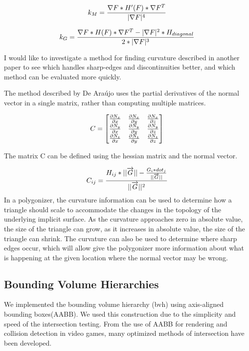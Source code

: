 \documentclass[conference]{acmsiggraph}
\begin{document}
$$k_M = {\nabla F * H'(F) * \nabla F^T \over |\nabla F|^4}$$

$$k_G = {\nabla F * H(F) * \nabla F^T - |\nabla F|^2 * H_{diagonal} \over 2 *
|\nabla F|^3}$$

I would like to investigate a method for finding curvature described in another
paper\cite{DeAraujo2004} to see which handles sharp-edges and discontinuities
better, and which method can be evaluated more quickly.

The method described by De Ara\'{u}jo uses the partial derivatives of the
normal vector in a single matrix, rather than computing multiple matrices.

$$
C=
\begin{bmatrix}
	{\partial N_x \over \partial x}&{\partial N_x \over \partial y}&{\partial N_x \over \partial z}\\
	{\partial N_y \over \partial x}&{\partial N_y \over \partial y}&{\partial N_y \over \partial z}\\
	{\partial N_z \over \partial x}&{\partial N_z \over \partial y}&{\partial N_z \over \partial z}
\end{bmatrix}
$$

The matrix C can be defined using the hessian matrix and the normal vector.

$$
C_{ij} = {H_{ij} * ||\overrightarrow{G}|| - {G_i * dot_j \over
	||\overrightarrow{G}||} \over ||\overrightarrow{G}||^2}
$$
In a polygonizer, the curvature information can be used to determine how a
triangle should scale to accommodate the changes in the topology of the
underlying implicit surface. As the curvature approaches zero in absolute value,
the size of the triangle can grow, as it increases in absolute value, the size
of the triangle can shrink. The curvature can also be used to determine where
sharp edges occur, which will allow give the polygonizer more information about
what is happening at the given location where the normal vector may be wrong.

\subsection{Bounding Volume Hierarchies}
We implemented the bounding volume hierarchy (bvh) using axis-aligned bounding
boxes(AABB). We used this construction due to the simplicity and speed of the
intersection testing. From the use of AABB for rendering and collision
detection in video games, many optimized methods of intersection have been
developed\cite{Williams}.
\end{document}
